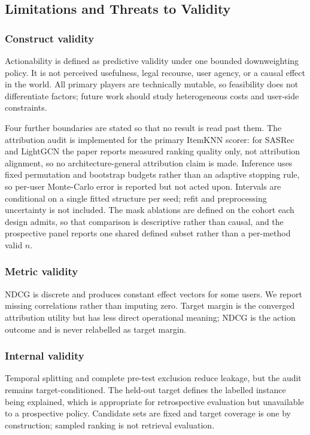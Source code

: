 \documentclass[manuscript,screen,review,anonymous]{acmart}
\begin{document}
\subsection{Limitations and Threats to Validity}\label{sec:limitations}
\subsubsection{Construct validity}
Actionability is defined as predictive validity under one bounded downweighting policy. It is not perceived usefulness, legal recourse, user agency, or a causal effect in the world. All primary players are technically mutable, so feasibility does not differentiate factors; future work should study heterogeneous costs and user-side constraints.

Four further boundaries are stated so that no result is read past them. The attribution audit is implemented for the primary ItemKNN scorer: for SASRec and LightGCN the paper reports measured ranking quality only, not attribution alignment, so no architecture-general attribution claim is made. Inference uses fixed permutation and bootstrap budgets rather than an adaptive stopping rule, so per-user Monte-Carlo error is reported but not acted upon. Intervals are conditional on a single fitted structure per seed; refit and preprocessing uncertainty is not included. The mask ablations are defined on the cohort each design admits, so that comparison is descriptive rather than causal, and the prospective panel reports one shared defined subset rather than a per-method valid $n$.

\subsubsection{Metric validity}
NDCG is discrete and produces constant effect vectors for some users. We report missing correlations rather than imputing zero. Target margin is the converged attribution utility but has less direct operational meaning; NDCG is the action outcome and is never relabelled as target margin.

\subsubsection{Internal validity}
Temporal splitting and complete pre-test exclusion reduce leakage, but the audit remains target-conditioned. The held-out target defines the labelled instance being explained, which is appropriate for retrospective evaluation but unavailable to a prospective policy. Candidate sets are fixed and target coverage is one by construction; sampled ranking is not retrieval evaluation.
\end{document}
